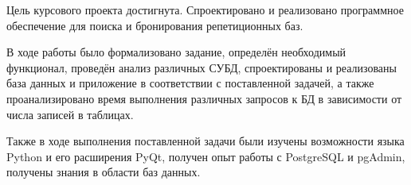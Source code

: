 
Цель курсового проекта достигнута. Спроектировано и реализовано программное обеспечение для поиска и бронирования репетиционных баз.

В ходе работы было формализовано задание, определён необходимый функционал, проведён анализ различных СУБД, спроектированы и реализованы база данных и приложение в соответствии с поставленной задачей, а также проанализировано время выполнения различных запросов к БД в зависимости от числа записей в таблицах.

Также в ходе выполнения поставленной задачи были изучены возможности языка Python и его расширения PyQt, получен опыт работы с PostgreSQL и pgAdmin, получены знания в области баз данных.